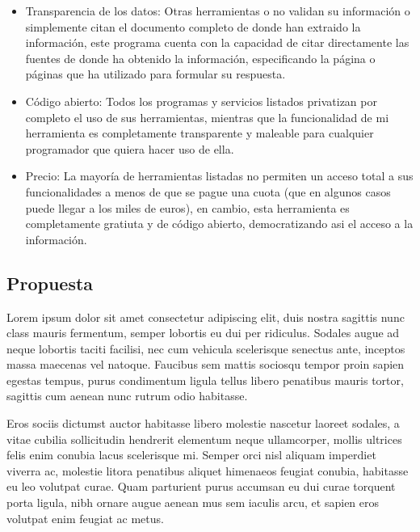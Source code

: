 \documentclass{article}
\begin{document}
\begin{itemize}

\item{Transparencia de los datos:}
Otras herramientas o no validan su información o simplemente citan el documento completo de donde han extraido la información, este programa cuenta con la capacidad de citar directamente las fuentes de donde ha obtenido la información, especificando la página o páginas que ha utilizado para formular su respuesta.

\item{Código abierto:}
Todos los programas y servicios listados privatizan por completo el uso de sus herramientas, mientras que la funcionalidad de mi herramienta es completamente transparente y maleable para cualquier programador que quiera hacer uso de ella.

\item{Precio:}
La mayoría de herramientas listadas no permiten un acceso total a sus funcionalidades a menos de que se pague una cuota (que en algunos casos puede llegar a los miles de euros), en cambio, esta herramienta es completamente gratiuta y de código abierto, democratizando asi el acceso a la información.

\end{itemize}

\subsection{Propuesta}
Lorem ipsum dolor sit amet consectetur adipiscing elit, duis nostra sagittis nunc class mauris fermentum, semper lobortis eu dui per ridiculus. Sodales augue ad neque lobortis taciti facilisi, nec cum vehicula scelerisque senectus ante, inceptos massa maecenas vel natoque. Faucibus sem mattis sociosqu tempor proin sapien egestas tempus, purus condimentum ligula tellus libero penatibus mauris tortor, sagittis cum aenean nunc rutrum odio habitasse.

Eros sociis dictumst auctor habitasse libero molestie nascetur laoreet sodales, a vitae cubilia sollicitudin hendrerit elementum neque ullamcorper, mollis ultrices felis enim conubia lacus scelerisque mi. Semper orci nisl aliquam imperdiet viverra ac, molestie litora penatibus aliquet himenaeos feugiat conubia, habitasse eu leo volutpat curae. Quam parturient purus accumsan eu dui curae torquent porta ligula, nibh ornare augue aenean mus sem iaculis arcu, et sapien eros volutpat enim feugiat ac metus.

\newpage
\end{document}
